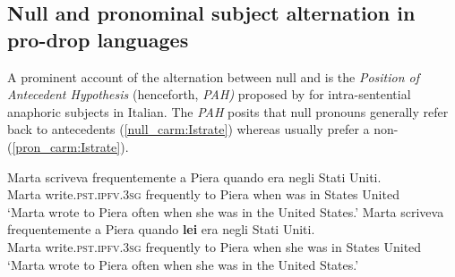 \documentclass[output=paper,colorlinks,citecolor=brown]{langscibook}
\begin{document}
\subsection{Null and pronominal subject alternation in pro-drop languages}

A prominent account of the alternation between null and  is the \textit{Position of Antecedent Hypothesis} (henceforth, \textit{PAH)} proposed by \citet{carminati2002processing} for intra-sentential anaphoric subjects in Italian. The \textit{PAH} posits that null  pronouns generally refer back to  antecedents (\ref{null_carm:Istrate}) whereas  usually prefer a non-  (\ref{pron_carm:Istrate}).

\ea \ea \label{null_carm:Istrate}
\gll Marta scriveva frequentemente a Piera quando era negli Stati Uniti. \\ 
Marta write.\textsc{pst.ipfv.3sg} frequently to Piera when was in States United\\
\glt`Marta wrote to Piera often when she was in the United States.'    
\ex \label{pron_carm:Istrate}
\gll Marta scriveva frequentemente a Piera quando \textbf{lei} era negli Stati Uniti. \\ 
Marta write.\textsc{pst.ipfv.3sg} frequently to Piera when she was in States United\\
\glt `Marta wrote to Piera often when she was in the United States.' 
\z
\z
\end{document}
